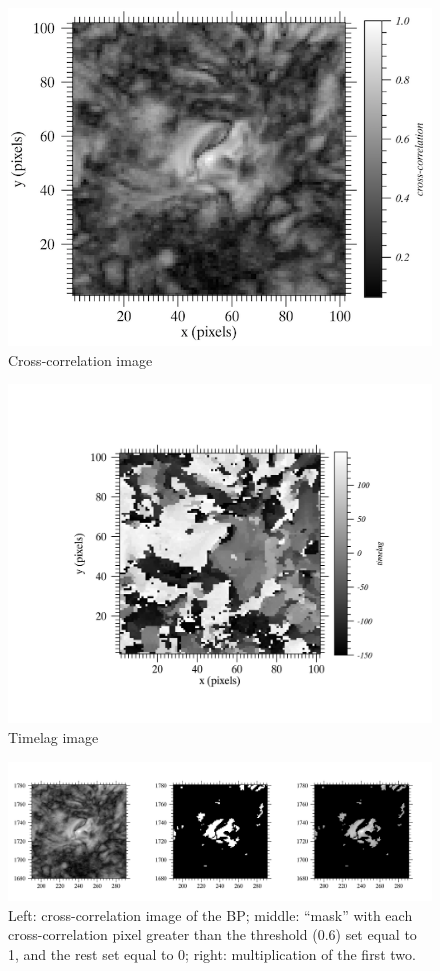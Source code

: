 \documentclass[preprint]{aastex}
\begin{document}
\begin{figure}[htb!]
    \centering
        \includegraphics[width=\textwidth]{../figures/bp1_cc.png}
        \caption{Cross-correlation image}
\end{figure}
\begin{figure}[htb!]
        \includegraphics[width=\textwidth]{../figures/bp1_tt.png}
        \caption{Timelag image}
\end{figure}
\begin{figure}[htb!]
        \includegraphics[width=\textwidth]{../figures/bp1_ccMask.png}
        \caption{Left: cross-correlation image of the BP;
        middle: ``mask'' with each cross-correlation pixel greater than
        the threshold (0.6) set equal to 1, and the rest set equal to 0;
        right: multiplication of the first two.}
        \label{ccMask}
\end{figure}
\end{document}
